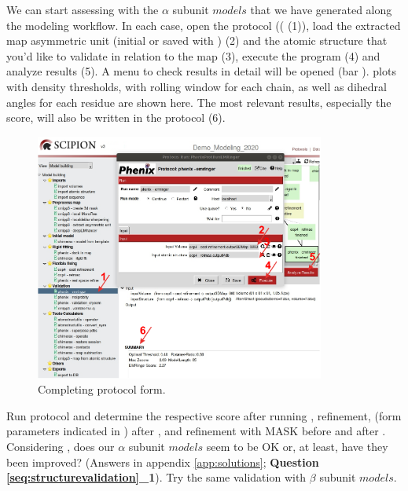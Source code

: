   
 We can start assessing with \emringer the  $\alpha$ subunit $models$ that we have generated along the modeling workflow. In each case, open the  protocol (( (1)), load the extracted map asymmetric unit (initial or saved with \coot) (2) and the atomic structure that you'd like to validate in relation to the map (3), execute the program (4) and analyze results (5). A menu to check results in detail will be opened (bar ).  plots with density thresholds, with rolling window for each chain, as well as dihedral angles for each residue are shown here. The most relevant results, especially the \emringer score, will also be written in the protocol  (6). 
 
  \begin{figure}[H]
  \centering 
  \captionsetup{width=.7\linewidth} 
  \includegraphics[width=0.85\textwidth]{Images/Fig34}
  \caption{Completing \emringer protocol form.}
  \label{fig:emringer_protocol}
  \end{figure}
 
 Run \emringer protocol and determine the respective score after running \chimera {} , \coot refinement, \phenix {} (form parameters indicated in ) after \coot, and  refinement with MASK before and after \phenix {}. Considering \emringer {}, does our  $\alpha$ subunit $models$ seem to be OK or, at least, have they been improved? (Answers in appendix \ref{app:solutions}; \textbf{Question \ref{seq:structurevalidation}\_1}). Try the same validation with $\beta$ subunit $models$. \\
 
